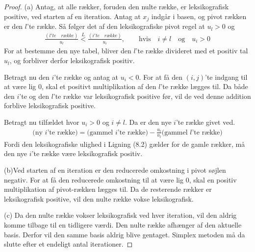 \begin{proof}
(a) Antag, at alle rækker, foruden den nulte række, er leksikografisk positive, ved starten af en iteration. Antag at $x_j$ indgår i basen, og pivot rækken er den $l$'te række. Så følger det af den leksikografiske pivot regel at $u_l>0$ og
\begin{align}
\frac{(l'te \quad række)}{u_l} \overset{L}{<} \frac{(i'te \quad række)}{u_i}, \quad \quad \text{hvis} \quad  i \neq l \quad \text{og} \quad u_i>0
\end{align}
For at bestemme den nye tabel, bliver den $l$'te række divideret med et positiv tal $u_l$, og forbliver derfor leksikografisk positiv. 

Betragt nu den $i$'te række og antag at $u_i<0$. For at få den $(i,j)$'te indgang til at være lig $0$, skal et positivt multiplikation af den $l$'te række lægges til. Da både den $i$'te og den $l$'te række var leksikografisk positive før, vil de ved denne addition forblive leksikografisk positive.

Betragt nu tilfældet hvor $u_i>0$ og $i \neq l$. Da er den nye $i$'te række givet ved. 
\begin{align*}
(\text{ny $i$'te række)}=\text{(gammel $i$'te række)}-\frac{u_i}{u_l}\text{(gammel $l$'te række)}
\end{align*}  
Fordi den leksikografiske ulighed i Ligning (8.2) gælder for de gamle rækker, må den nye $i$'te række være leksikografisk positiv. 

(b)Ved starten af en iteration er den reducerede omkostning i pivot søjlen negativ. For at få den reducerede omkostning til at være lig $0$, skal en positiv multiplikation af pivot-rækken lægges til. Da de resterende rækker er leksikografisk positive, vil den nulte række vokse leksikografisk. 


(c) Da den nulte række vokser leksikografisk ved hver iteration, vil den aldrig komme tilbage til en tidligere værdi. Den nulte række afhænger af den aktuelle basis. Derfor vil den samme basis aldrig blive gentaget. Simplex metoden må da slutte efter et endeligt antal iterationer. 
\end{proof}

